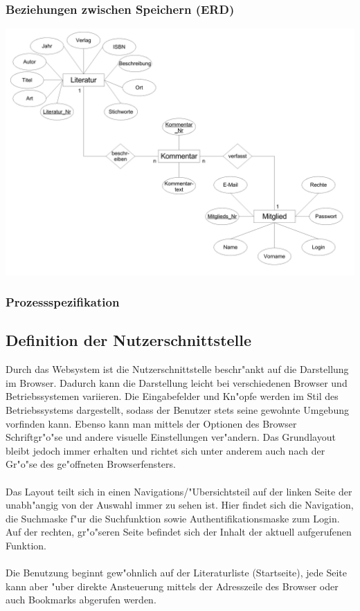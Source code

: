 \subsubsection{Beziehungen zwischen Speichern (ERD)}
\includegraphics[scale=0.36]{erd1}

\subsubsection{Prozessspezifikation}






\subsection{Definition der Nutzerschnittstelle}

Durch das Websystem ist die Nutzerschnittstelle beschr"ankt auf die Darstellung im Browser. Dadurch kann die Darstellung
leicht bei verschiedenen Browser und Betriebssystemen variieren. Die Eingabefelder und Kn"opfe werden im Stil des 
Betriebssystems dargestellt, sodass der Benutzer stets seine gewohnte Umgebung vorfinden kann. Ebenso kann man mittels der Optionen
des Browser Schriftgr"o"se und andere visuelle Einstellungen ver"andern. Das Grundlayout bleibt jedoch immer erhalten
und richtet sich unter anderem auch nach der Gr"o"se des ge"offneten Browserfensters.\\
\\
Das Layout teilt sich in einen Navigations/"Ubersichtsteil auf der linken Seite der unabh"angig von der Auswahl immer
zu sehen ist. Hier findet sich die Navigation, die Suchmaske f"ur die Suchfunktion sowie Authentifikationsmaske zum Login.
Auf der rechten, gr"o"seren Seite befindet sich der Inhalt der aktuell aufgerufenen Funktion.\\
\\
Die Benutzung beginnt gew"ohnlich auf der Literaturliste (Startseite), jede Seite kann aber "uber direkte
Ansteuerung mittels der Adresszeile des Browser oder auch Bookmarks abgerufen werden.\\

